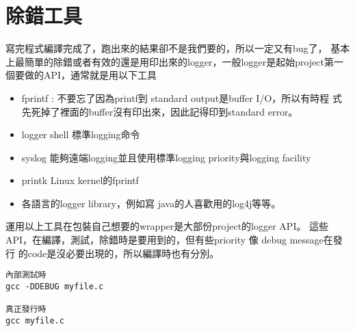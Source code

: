 \chapter{除錯工具}
寫完程式編譯完成了，跑出來的結果卻不是我們要的，所以一定又有bug了，
基本上最簡單的除錯或者有效的還是用印出來的logger，一般logger是起始project第一
個要做的API，通常就是用以下工具
\begin{itemize}
  \item fprintf : 不要忘了因為printf到 standard output是buffer I/O，所以有時程
    式先死掉了裡面的buffer沒有印出來，因此記得印到standard error。
  \item logger shell 標準logging命令
  \item syslog 能夠遠端logging並且使用標準logging priority與logging facility
  \item printk Linux kernel的fprintf
  \item 各語言的logger library，例如寫 java的人喜歡用的log4j等等。
\end{itemize}
運用以上工具在包裝自己想要的wrapper是大部份project的logger API。
這些API，在編譯，測試，除錯時是要用到的，但有些priority 像 debug message在發行
的code是沒必要出現的，所以編譯時也有分別。
\begin{verbatim}
內部測試時
gcc -DDEBUG myfile.c

真正發行時
gcc myfile.c
\end{verbatim}

